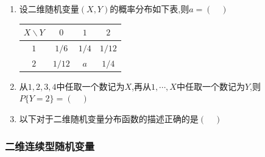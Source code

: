 \begin{enumerate}
  \item 设二维随机变量$(X,Y)$的概率分布如下表,则$a=(\quad)$
  \begin{table}[htbp]
    \centering
    \begin{tabular}{cccc}
      \toprule
      $X\backslash Y$ & $0$      & $1$      & $2$      \\
      \midrule
      $1$             & $1/6$    & $1/4$    & $1/12$   \\
      $2$             & $1/12$   & $a$      & $1/4$    \\
      \bottomrule
    \end{tabular}
  \end{table}

  \item 从$1,2,3,4$中任取一个数记为$X$,再从$1,\cdots,X$中任取一个数记为$Y$,则$P\{Y=2\}=(\quad)$

  \item 以下对于二维随机变量分布函数的描述正确的是$(\quad)$
\end{enumerate}


\subsubsection{二维连续型随机变量}

